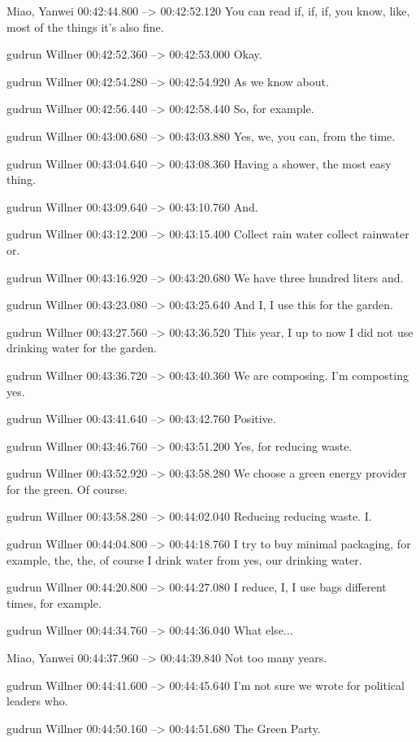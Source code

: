 {Miao, Yanwei 00:42:44.800 --> 00:42:52.120
You can read if, if, if, you know, like, most of the things it's also fine.

gudrun Willner 00:42:52.360 --> 00:42:53.000
Okay.

gudrun Willner 00:42:54.280 --> 00:42:54.920
As we know about.

gudrun Willner 00:42:56.440 --> 00:42:58.440
So, for example.

gudrun Willner 00:43:00.680 --> 00:43:03.880
Yes, we, you can, from the time.

gudrun Willner 00:43:04.640 --> 00:43:08.360
Having a shower, the most easy thing.

gudrun Willner 00:43:09.640 --> 00:43:10.760
And.

gudrun Willner 00:43:12.200 --> 00:43:15.400
Collect rain water collect rainwater or.

gudrun Willner 00:43:16.920 --> 00:43:20.680
We have three hundred liters and.

gudrun Willner 00:43:23.080 --> 00:43:25.640
And I, I use this for the garden.

gudrun Willner 00:43:27.560 --> 00:43:36.520
This year, I up to now I did not use drinking water for the garden.

gudrun Willner 00:43:36.720 --> 00:43:40.360
We are composing. I'm composting yes.

gudrun Willner 00:43:41.640 --> 00:43:42.760
Positive.

gudrun Willner 00:43:46.760 --> 00:43:51.200
Yes, for reducing waste.

gudrun Willner 00:43:52.920 --> 00:43:58.280
We choose a green energy provider for the green. Of course.

gudrun Willner 00:43:58.280 --> 00:44:02.040
Reducing reducing waste. I.

gudrun Willner 00:44:04.800 --> 00:44:18.760
I try to buy minimal packaging, for example, the, the, of course I drink water from yes, our drinking water.

gudrun Willner 00:44:20.800 --> 00:44:27.080
I reduce, I, I use bags different times, for example.

gudrun Willner 00:44:34.760 --> 00:44:36.040
What else...

Miao, Yanwei 00:44:37.960 --> 00:44:39.840
Not too many years.

gudrun Willner 00:44:41.600 --> 00:44:45.640
I'm not sure we wrote for political leaders who.

gudrun Willner 00:44:50.160 --> 00:44:51.680
The Green Party.

}

